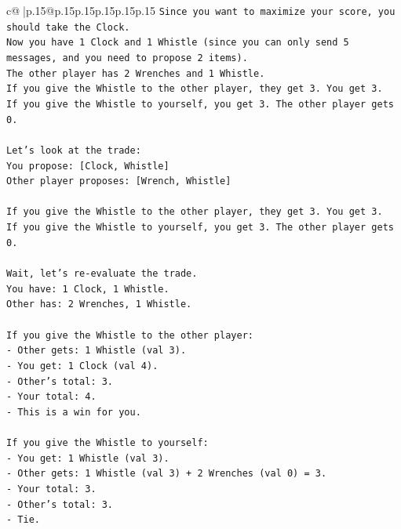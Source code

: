 \documentclass{article}
\begin{document}
{\begin{supertabular}{c@{$\;$}|p{.15\linewidth}@{}p{.15\linewidth}p{.15\linewidth}p{.15\linewidth}p{.15\linewidth}p{.15\linewidth}}
{{{\texttt{Since you want to maximize your score, you should take the Clock.} \\
\texttt{Now you have 1 Clock and 1 Whistle (since you can only send 5 messages, and you need to propose 2 items).} \\
\texttt{The other player has 2 Wrenches and 1 Whistle.} \\
\texttt{If you give the Whistle to the other player, they get 3. You get 3.} \\
\texttt{If you give the Whistle to yourself, you get 3. The other player gets 0.} \\
\\ 
\texttt{Let's look at the trade:} \\
\texttt{You propose: {[}Clock, Whistle{]}} \\
\texttt{Other player proposes: {[}Wrench, Whistle{]}} \\
\\ 
\texttt{If you give the Whistle to the other player, they get 3. You get 3.} \\
\texttt{If you give the Whistle to yourself, you get 3. The other player gets 0.} \\
\\ 
\texttt{Wait, let's re{-}evaluate the trade.} \\
\texttt{You have: 1 Clock, 1 Whistle.} \\
\texttt{Other has: 2 Wrenches, 1 Whistle.} \\
\\ 
\texttt{If you give the Whistle to the other player:} \\
\texttt{{-} Other gets: 1 Whistle (val 3).} \\
\texttt{{-} You get: 1 Clock (val 4).} \\
\texttt{{-} Other's total: 3.} \\
\texttt{{-} Your total: 4.} \\
\texttt{{-} This is a win for you.} \\
\\ 
\texttt{If you give the Whistle to yourself:} \\
\texttt{{-} You get: 1 Whistle (val 3).} \\
\texttt{{-} Other gets: 1 Whistle (val 3) + 2 Wrenches (val 0) = 3.} \\
\texttt{{-} Your total: 3.} \\
\texttt{{-} Other's total: 3.} \\
\texttt{{-} Tie.} \\
\\ 
}}}
\end{supertabular}}
\end{document}
